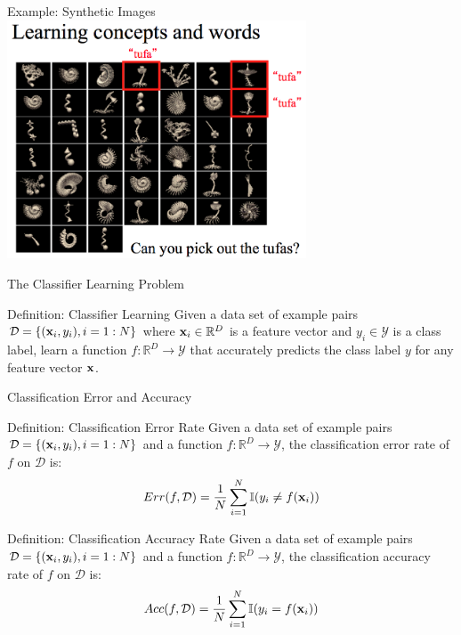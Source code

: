 \documentclass[serif,xcolor=pdftex,dvipsnames,table,hyperref={bookmarks=false}]{beamer}
\begin{document}
\begin{frame}[t]{Example: Synthetic Images}
 \centering
 \includegraphics[width=3.5in]{../Figures/tufas.png}
\end{frame}

\begin{frame}[t]{The Classifier Learning Problem}
\begin{block}{Definition: Classifier Learning}
Given a data set of example pairs $\mathcal{D}=\{({\mathbf{x}}_i,y_i),i=1:N\}$ where ${\mathbf{x}}_i\in\mathbb{R}^D$ is a feature vector and $y_i\in \mathcal{Y}$ is a class label, learn a function $f:\mathbb{R}^D\rightarrow \mathcal{Y}$ that accurately predicts the class label $y$ for any feature vector ${\mathbf{x}}$.
\end{block}
\end{frame}

\begin{frame}[t]{Classification Error and Accuracy}

\begin{block}{Definition: Classification Error Rate}
Given a data set of example pairs $\mathcal{D}=\{({\mathbf{x}}_i,y_i),i=1:N\}$ and a function $f:\mathbb{R}^D\rightarrow \mathcal{Y}$, the classification error rate of $f$ on $\mathcal{D}$ is:
$$Err(f,\mathcal{D}) = \frac{1}{N}\sum_{i=1}^N\mathbb{I}(y_i \neq f({\mathbf{x}}_i))$$
\end{block}

\pause
\begin{block}{Definition: Classification Accuracy Rate}
Given a data set of example pairs $\mathcal{D}=\{({\mathbf{x}}_i,y_i),i=1:N\}$ and a function $f:\mathbb{R}^D\rightarrow \mathcal{Y}$, the classification accuracy rate of $f$ on $\mathcal{D}$ is:
$$Acc(f,\mathcal{D}) = \frac{1}{N}\sum_{i=1}^N\mathbb{I}(y_i = f({\mathbf{x}}_i))$$
\end{block}


\end{frame}
\end{document}
